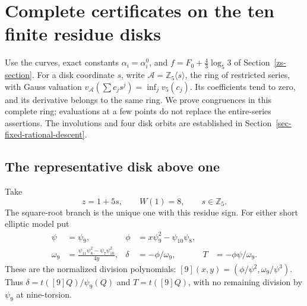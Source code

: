 \section{Complete certificates on the ten finite residue disks}
\label{sec-fixed-finite-disks}

Use the curves, exact constants \(\alpha_i=\alpha_i^0\), and
\(f=F_0+\frac43\log_5 3\) of Section~\ref{zs-section}.
For a disk coordinate \(s\), write
\(\mathcal A=\mathbb Z_5\langle s\rangle\), the ring of restricted
series, with Gauss valuation
\(v_{\mathcal A}(\sum c_js^j)=\inf_jv_5(c_j)\).
Its coefficients tend to zero, and its derivative belongs to the same
ring. We prove congruences in this complete ring; evaluations at a few
points do not replace the entire-series assertions.
The involutions and four disk orbits are established in
Section~\ref{sec-fixed-rational-descent}.

\subsection{The representative disk above one}

Take
\begin{equation}
 z=1+5s,\qquad W(1)=8,\qquad s\in\mathbb Z_5.
 \label{ud-disk}
\end{equation}
The square-root branch is the unique one with this residue sign.
For either short elliptic model put
\begin{align}
 \psi&=\psi_9,&\phi&=x\psi_9^2-\psi_{10}\psi_8,\\
 \omega_9&=\frac{\psi_{11}\psi_8^2-\psi_7\psi_{10}^2}{4y},&
 \delta&=-\phi/\omega_9,&T&=-\phi\psi/\omega_9.
 \label{ud-division-functions}
\end{align}
These are the normalized division polynomials:
\([9](x,y)=(\phi/\psi^2,\omega_9/\psi^3)\).
Thus \(\delta=t([9]Q)/\psi_9(Q)\) and \(T=t([9]Q)\), with no
remaining division by \(\psi_9\) at nine-torsion.


